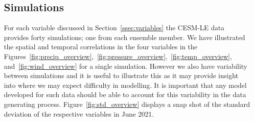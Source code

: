 \subsection{Simulations}
For each variable discussed in Section~\ref{ssec:variables} the CESM-LE data provides forty simulations; one from each ensemble member.
We have illustrated the spatial and temporal correlations in the four variables in the Figures~\ref{fig:precip_overview},~\ref{fig:pressure_overview},~\ref{fig:temp_overview}, and~\ref{fig:wind_overview} for a single simulation.
However we also have variability between simulations and it is useful to illustrate this as it may provide insight into where we may expect difficulty in modelling.
It is important that any model developed for such data should be able to account for this variability in the data generating process.
Figure~\ref{fig:std_overview} displays a snap shot of the standard deviation of the respective variables in June 2021.

